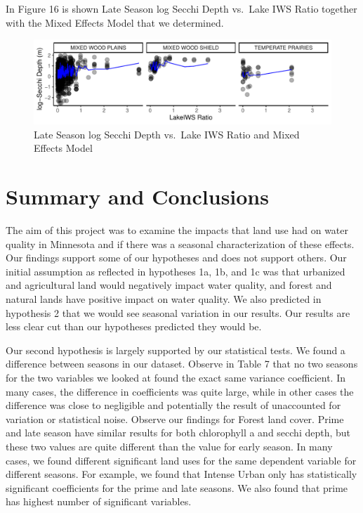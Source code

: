 \documentclass[12pt,]{article}
\begin{document}
In Figure 16 is shown Late Season log Secchi Depth vs.~Lake IWS Ratio
together with the Mixed Effects Model that we determined.

\begin{figure}
\centering
\includegraphics{Bollt_Greif_Raby_Roth_Project_Final_files/figure-latex/unnamed-chunk-35-1.pdf}
\caption{Late Season log Secchi Depth vs.~Lake IWS Ratio and Mixed
Effects Model}
\end{figure}

\newpage

\hypertarget{summary-and-conclusions}{%
\section{Summary and Conclusions}\label{summary-and-conclusions}}

The aim of this project was to examine the impacts that land use had on
water quality in Minnesota and if there was a seasonal characterization
of these effects. Our findings support some of our hypotheses and does
not support others. Our initial assumption as reflected in hypotheses
1a, 1b, and 1c was that urbanized and agricultural land would negatively
impact water quality, and forest and natural lands have positive impact
on water quality. We also predicted in hypothesis 2 that we would see
seasonal variation in our results. Our results are less clear cut than
our hypotheses predicted they would be.

Our second hypothesis is largely supported by our statistical tests. We
found a difference between seasons in our dataset. Observe in Table 7
that no two seasons for the two variables we looked at found the exact
same variance coefficient. In many cases, the difference in coefficients
was quite large, while in other cases the difference was close to
negligible and potentially the result of unaccounted for variation or
statistical noise. Observe our findings for Forest land cover. Prime and
late season have similar results for both chlorophyll a and secchi
depth, but these two values are quite different than the value for early
season. In many cases, we found different significant land uses for the
same dependent variable for different seasons. For example, we found
that Intense Urban only has statistically significant coefficients for
the prime and late seasons. We also found that prime has highest number
of significant variables.
\end{document}
